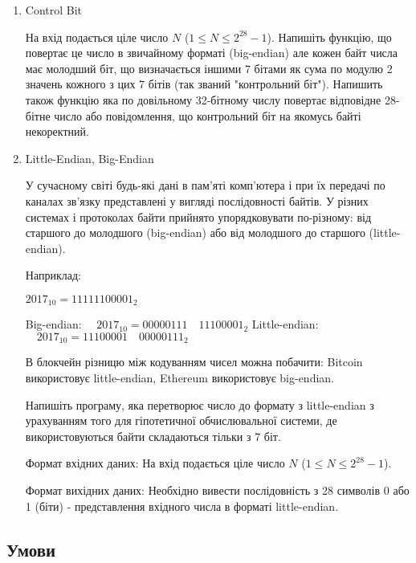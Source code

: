\documentclass[]{article}
\begin{document}
\begin{enumerate}
\item Control Bit

На вхід подається ціле число $N $ ($1\le N \le 2^{28}-1 $).
Напишіть функцію, що повертає це число в звичайному форматі (big-endian) але
кожен байт числа має молодший біт, що визначається іншими 7 бітами 
як сума по модулю 2  значень кожного з цих 7 бітів (так званий "контрольний біт").
Напишить також функцію яка по довільному 32-бітному числу повертає відповідне 28-бітне число
або повідомлення, що контрольний біт на якомусь байті некоректний.

\item

Little-Endian, Big-Endian

У сучасному світі будь-які дані в пам'яті комп'ютера і при їх передачі по каналах зв'язку представлені у вигляді послідовності байтів. У різних системах і протоколах байти прийнято упорядковувати по-різному: від старшого до молодшого (big-endian) або від молодшого до старшого (little-endian).

Наприклад:

$2017_{10} = 11111100001_{2}$

Big-endian: $ \quad 2017_{10} = 00000111 \quad 11100001_{2}$
Little-endian:$ \quad 2017_{10} = 11100001\quad 00000111_{2} $

В блокчейн різницю між кодуванням чисел можна побачити: Bitcoin використовує little-endian, Ethereum використовує big-endian.

Напишіть програму, яка перетворює число до формату з little-endian з урахуванням того для гіпотетичної обчислювальної системи, де використовуються байти складаються тільки з 7 біт.

Формат вхідних даних:
На вхід подається ціле число $N $ ($1\le N \le 2^{28}-1 $).

Формат вихідних даних:
Необхідно вивести послідовність з 28 символів 0 або 1 (біти) - представлення вхідного числа в форматі little-endian.


\end{enumerate}

\subsection{Умови}
\end{document}
